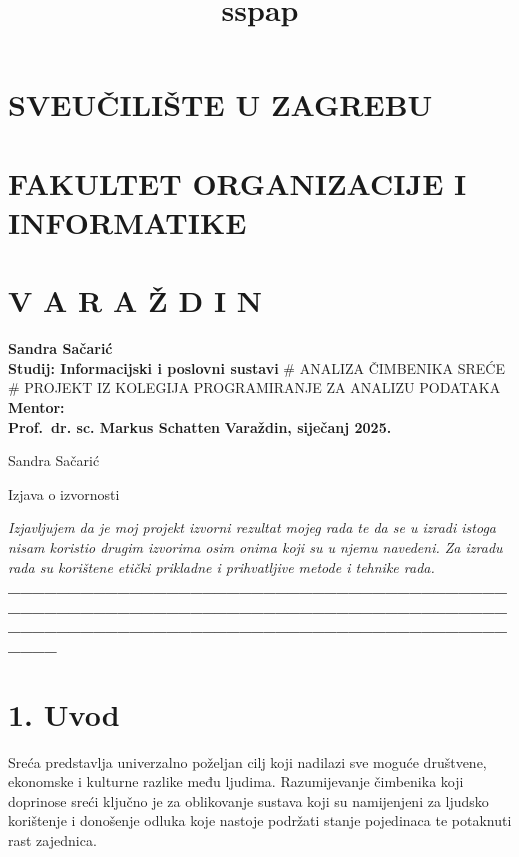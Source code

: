\documentclass[11pt]{article}
\title{sspap}
\begin{document}
    
    \maketitle
    
    

    
    \hypertarget{sveuux10diliux161te-u-zagrebu}{%
\section{SVEUČILIŠTE U ZAGREBU}\label{sveuux10diliux161te-u-zagrebu}}

\hypertarget{fakultet-organizacije-i-informatike}{%
\section{FAKULTET ORGANIZACIJE I
INFORMATIKE}\label{fakultet-organizacije-i-informatike}}

\hypertarget{v-a-r-a-ux17e-d-i-n}{%
\section{V A R A Ž D I N}\label{v-a-r-a-ux17e-d-i-n}}

\textbf{Sandra Sačarić\\
Studij: Informacijski i poslovni sustavi} \# ANALIZA ČIMBENIKA SREĆE \#
PROJEKT IZ KOLEGIJA PROGRAMIRANJE ZA ANALIZU PODATAKA \textbf{Mentor:}\\
\textbf{Prof.~dr. sc. Markus Schatten} \textbf{Varaždin, siječanj 2025.}

    Sandra Sačarić

Izjava o izvornosti

\emph{Izjavljujem da je moj projekt izvorni rezultat mojeg rada te da se
u izradi istoga nisam koristio drugim izvorima osim onima koji su u
njemu navedeni. Za izradu rada su korištene etički prikladne i
prihvatljive metode i tehnike rada.}
\textbf{\_\_\_\_\_\_\_\_\_\_\_\_\_\_\_\_\_\_\_\_\_\_\_\_\_\_\_\_\_\_\_\_\_\_\_\_\_\_\_\_\_\_\_\_\_\_\_\_\_\_\_\_\_\_\_\_\_\_\_\_\_\_\_\_\_\_\_\_\_\_\_\_\_\_\_\_\_\_\_\_\_\_\_\_\_\_\_\_\_\_\_\_\_\_\_\_\_\_\_\_\_\_\_\_\_\_\_\_\_\_\_\_\_\_\_\_\_\_\_\_\_\_\_\_\_\_\_}

    \hypertarget{uvod}{%
\section{1. Uvod}\label{uvod}}

Sreća predstavlja univerzalno poželjan cilj koji nadilazi sve moguće
društvene, ekonomske i kulturne razlike među ljudima. Razumijevanje
čimbenika koji doprinose sreći ključno je za oblikovanje sustava koji su
namijenjeni za ljudsko korištenje i donošenje odluka koje nastoje
podržati stanje pojedinaca te potaknuti rast zajednica.
\end{document}
